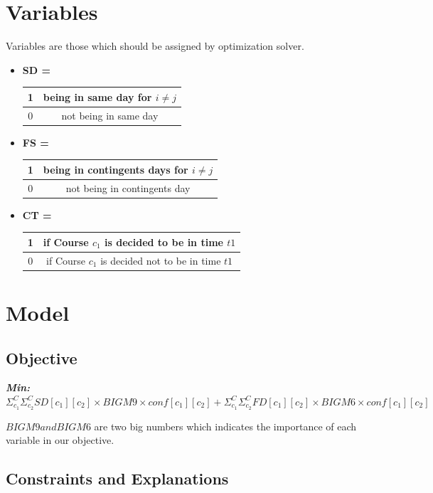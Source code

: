 \documentclass{report}
\begin{document}
\section{Variables}
Variables are those which should be assigned by optimization solver.
\begin{itemize}
\item
{\textbf{SD \big[ C \big]\big[ C \big]  \space =}
\begin{tabular}{| c | c |} \hline
1 & being in same day for $i \neq j$ \\ \hline
0 & not being in same day \\ \hline
\end{tabular}}

\item{
\textbf{FS \big[ C \big]\big[ C \big]  \space =}
\begin{tabular}{| c | c |} \hline
1 & being in contingents days for $i \neq j$ \\ \hline
0 & not being in contingents day \\ \hline
\end{tabular}}

\item{
\textbf{CT \big[ C \big]\big[ T \big]  \space =}
\begin{tabular}{| c | c |} \hline
1 & if Course $c_1$ is decided to be in time $t1$  \\ \hline
0 & if Course $c_1$ is decided not to be in time $t1$ \\ \hline
\end{tabular}}


\end{itemize}

\section{Model}
\subsection{Objective}

\textbf{ \textit{Min:} } $\Sigma_{c_1}^{C} \Sigma_{c_2}^{C} SD[c_1][c_2] \times BIGM9 \times conf[c_1][c_2] + \Sigma_{c_1}^{C} \Sigma_{c_2}^{C} FD[c_1][c_2] \times BIGM6 \times conf[c_1][c_2]  $  \newline 

$BIGM9 and BIGM6$ are two big numbers which indicates the importance of each variable in our objective.
\subsection{Constraints and Explanations}
\end{document}
